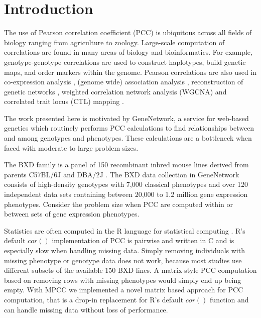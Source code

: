 \documentclass{bioinfo}
\begin{document}
\maketitle


\section{Introduction}

The use of Pearson correlation coefficient (PCC) is ubiquitous across all 
fields of biology ranging from agriculture to zoology. Large-scale 
computation of correlations are found in many areas of biology and 
bioinformatics.  For example, genotype-genotype correlations are 
used to construct haplotypes, build genetic maps, and order markers 
within the genome. Pearson correlations are also used in 
co-expression analysis \citep{Tesson:2010}, (genome wide) 
association analysis \citep{Cichonska:2016}, reconstruction of genetic
networks \citep{Fukushima:2013}, weighted correlation network analysis
(WGCNA) \citep{Horvath:2008} and correlated trait locus (CTL)
mapping \citep{Arends2016a}.

\enlargethispage{12pt}

The work presented here is motivated by GeneNetwork, a service for
web-based genetics \citep{Sloan2016} which routinely performs PCC 
calculations to find relationships between and among genotypes and 
phenotypes. These calculations are a bottleneck when faced with 
moderate to large problem sizes.

The BXD family is a panel of 150 recombinant inbred mouse lines
derived from parents C57BL/6J and DBA/2J \citep{Ashbrook:2019}. The
BXD data collection in GeneNetwork consists of high-density genotypes
with 7,000 classical phenotypes and over 120 independent data sets containing
between 20,000 to 1.2 million gene expression phenotypes. Consider 
the problem size when PCC are computed within or between sets 
of gene expression phenotypes. 

Statistics are often computed in the R language for statistical computing 
\citep{R:2005}. R's default $cor()$ implementation of PCC is pairwise 
and written in C and is especially slow when handling missing data. 
Simply removing individuals with missing phenotype or genotype data does 
not work, because most studies use different subsets of the available 
150 BXD lines. A matrix-style PCC computation based on removing rows 
with missing phenotypes would simply end up being empty. With MPCC we 
implemented a novel matrix based approach for PCC computation, that is a 
drop-in replacement for R's default $cor()$ function and can handle 
missing data without loss of performance.
\end{document}
